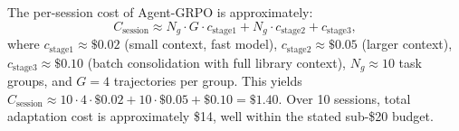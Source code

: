 The per-session cost of Agent-GRPO is approximately:
\begin{equation}
    C_{\text{session}} \approx N_g \cdot G \cdot c_{\text{stage1}} + N_g \cdot c_{\text{stage2}} + c_{\text{stage3}},
    \label{eq:cost}
\end{equation}
where $c_{\text{stage1}} \approx \$0.02$ (small context, fast model),
$c_{\text{stage2}} \approx \$0.05$ (larger context), $c_{\text{stage3}} \approx \$0.10$
(batch consolidation with full library context), $N_g \approx 10$ task groups,
and $G = 4$ trajectories per group. This yields
$C_{\text{session}} \approx 10 \cdot 4 \cdot \$0.02 + 10 \cdot \$0.05 + \$0.10 = \$1.40$.
Over 10 sessions, total adaptation cost is approximately \$14, well within
the stated sub-\$20 budget.

